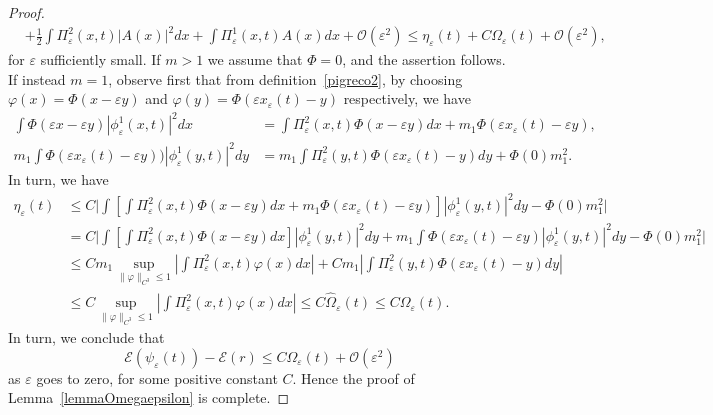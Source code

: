 \documentclass[11pt]{amsart}
\numberwithin{equation}{section}
\theoremstyle{definition}
\begin{document}
\begin{proof}
\begin{align*}
& +\frac{1}{2}\int \Pi_{\varepsilon}^2(x, t)|A(x)|^2dx +\int \Pi_{\varepsilon}^1(x, t)A(x)dx+{\mathcal O}({\varepsilon}^2)
\leq \eta_{\varepsilon}(t)+C\Omega_{\varepsilon}(t)+\mathcal O({\varepsilon}^2),
\end{align*}
for ${\varepsilon}$ sufficiently small. If $m>1$ we assume that $\Phi=0$, and the assertion follows.
If instead $m=1$, observe first that from definition~\eqref{pigreco2},
by choosing $\varphi(x)=\Phi(x-{\varepsilon} y)$ and $\varphi(y)=\Phi({\varepsilon} x_{\varepsilon}(t)-y)$
respectively, we have
\begin{align*}
 \int \Phi({\varepsilon} x-{\varepsilon} y)|\phi_{\varepsilon}^1(x,t)|^2dx  &=
\int \Pi^2_{\varepsilon}(x,t)\Phi(x-{\varepsilon} y) dx +m_1\Phi({\varepsilon} x_{\varepsilon}(t)-{\varepsilon} y),  \\
 m_1\int \Phi({\varepsilon} x_{\varepsilon}(t)-{\varepsilon} y))|\phi_{\varepsilon}^1(y,t)|^2dy &=
m_1\int \Pi^2_{\varepsilon}(y,t)\Phi({\varepsilon} x_{\varepsilon}(t)- y) dy +\Phi(0)m_1^2.
\end{align*}
In turn, we have
\begin{align*}
\eta_{\varepsilon}(t) & \leq C\Big|\int\left[
\int \Pi^2_{\varepsilon}(x,t)\Phi(x-{\varepsilon} y) dx +m_1\Phi({\varepsilon} x_{\varepsilon}(t)-{\varepsilon} y)
\right]|\phi_{\varepsilon}^1(y,t)|^2dy-\Phi(0)m_1^2\Big| \\
& = C\Big|\int\left[
\int \Pi^2_{\varepsilon}(x,t)\Phi(x-{\varepsilon} y) dx\right]|\phi_{\varepsilon}^1(y,t)|^2dy +m_1\int \Phi({\varepsilon} x_{\varepsilon}(t)-{\varepsilon} y)
|\phi_{\varepsilon}^1(y,t)|^2dy-\Phi(0)m_1^2\Big| \\
&\leq Cm_1\sup_{\|\varphi\|_{C^3}\leq 1} \left|\int
\Pi^2_{\varepsilon}(x,t)\varphi(x)dx\right|+C m_1\left|\int \Pi^2_{\varepsilon}(y,t)\Phi({\varepsilon} x_{\varepsilon}(t)- y) dy\right|  \\
&\leq C\sup_{\|\varphi\|_{C^3}\leq 1} \left|\int
\Pi^2_{\varepsilon}(x,t)\varphi(x)dx\right|\leq C\hat \Omega_{\varepsilon}(t)\leq C\Omega_{\varepsilon}(t).
\end{align*}
In turn, we conclude that
$$
\mathcal E(\psi_{\varepsilon}(t)) -\mathcal E(r)\leq C\Omega_{\varepsilon}(t)+\mathcal O({\varepsilon}^2)
$$
as ${\varepsilon}$ goes to zero, for some positive constant $C$. Hence the
proof of Lemma~\ref{lemmaOmegaepsilon} is complete.
\end{proof}
\end{document}
